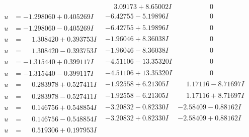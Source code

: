 \documentclass[1p]{elsarticle_modified}
\theoremstyle{definition}
\begin{document}
$$\begin{array}{c|c|c}
 & \phantom{-}3.09173 + 8.65002 I & \phantom{-0.000000 } 0 \\ \hline\begin{aligned}
u &= -1.298060 + 0.405269 I\end{aligned}
 & -6.42755 - 5.19896 I & \phantom{-0.000000 } 0 \\ \hline\begin{aligned}
u &= -1.298060 - 0.405269 I\end{aligned}
 & -6.42755 + 5.19896 I & \phantom{-0.000000 } 0 \\ \hline\begin{aligned}
u &= \phantom{-}1.308420 + 0.393753 I\end{aligned}
 & -1.96046 + 8.36038 I & \phantom{-0.000000 } 0 \\ \hline\begin{aligned}
u &= \phantom{-}1.308420 - 0.393753 I\end{aligned}
 & -1.96046 - 8.36038 I & \phantom{-0.000000 } 0 \\ \hline\begin{aligned}
u &= -1.315440 + 0.399117 I\end{aligned}
 & -4.51106 - 13.35320 I & \phantom{-0.000000 } 0 \\ \hline\begin{aligned}
u &= -1.315440 - 0.399117 I\end{aligned}
 & -4.51106 + 13.35320 I & \phantom{-0.000000 } 0 \\ \hline\begin{aligned}
u &= \phantom{-}0.283978 + 0.527411 I\end{aligned}
 & -1.92558 + 6.21305 I & \phantom{-}1.17116 - 8.71697 I \\ \hline\begin{aligned}
u &= \phantom{-}0.283978 - 0.527411 I\end{aligned}
 & -1.92558 - 6.21305 I & \phantom{-}1.17116 + 8.71697 I \\ \hline\begin{aligned}
u &= \phantom{-}0.146756 + 0.548854 I\end{aligned}
 & -3.20832 - 0.82330 I & -2.58409 - 0.88162 I \\ \hline\begin{aligned}
u &= \phantom{-}0.146756 - 0.548854 I\end{aligned}
 & -3.20832 + 0.82330 I & -2.58409 + 0.88162 I \\ \hline\begin{aligned}
u &= \phantom{-}0.519306 + 0.197953 I\end{aligned}

\end{array}$$
\end{document}
